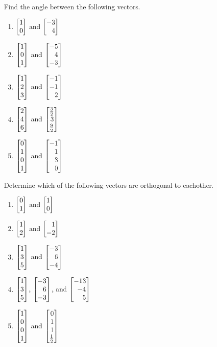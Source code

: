\begin{exercises}
\begin{problist}
\begin{enumerate}
		\end{enumerate}
		\prob Find the angle between the following vectors.
		\begin{enumerate}
			\item $\mat{1\\0}$ and $\mat{-3\\4}$
			\item $\mat{1\\0\\1}$ and $\mat{-5\\4\\-3}$
			\item $\mat{1\\2\\3}$ and $\mat{-1\\-1\\2}$
			\item $\mat{2\\4\\6}$ and $\mat{\frac{3}{2}\\3\\\frac{9}{2}}$
			\item $\mat{0\\1\\0\\1}$ and $\mat{-1\\1\\3\\0}$
		\end{enumerate}
		\prob Determine which of the following vectors are orthogonal to eachother.
		\begin{enumerate}
			\item $\mat{0\\1}$ and $\mat{1\\0}$
			\item $\mat{1\\2}$ and $\mat{1\\-2}$
			\item $\mat{1\\3\\5}$ and $\mat{-3\\6\\-4}$
			\item $\mat{1\\3\\5}$, $\mat{-3\\6\\-3}$, and $\mat{-13\\-4\\5}$
			\item $\mat{1\\0\\0\\1}$ and $\mat{0\\1\\1\\\frac{1}{2}}$
		\end{enumerate}


\end{problist}
\end{exercises}
